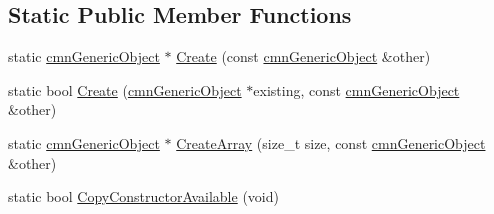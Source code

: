 \subsection*{Static Public Member Functions}
\begin{DoxyCompactItemize}
\item 
static \hyperlink{classcmn_generic_object}{cmn\-Generic\-Object} $\ast$ \hyperlink{classcmn_conditional_object_factory_copy_3_01true_00_01mts_generic_object_proxy_3_01__element_type_01_4_01_4_a7e210cb7361d95eb1a34c97960e260f6}{Create} (const \hyperlink{classcmn_generic_object}{cmn\-Generic\-Object} \&other)
\item 
static bool \hyperlink{classcmn_conditional_object_factory_copy_3_01true_00_01mts_generic_object_proxy_3_01__element_type_01_4_01_4_ac0df6ce8746ed47ad7cd37d5a4e576a3}{Create} (\hyperlink{classcmn_generic_object}{cmn\-Generic\-Object} $\ast$existing, const \hyperlink{classcmn_generic_object}{cmn\-Generic\-Object} \&other)
\item 
static \hyperlink{classcmn_generic_object}{cmn\-Generic\-Object} $\ast$ \hyperlink{classcmn_conditional_object_factory_copy_3_01true_00_01mts_generic_object_proxy_3_01__element_type_01_4_01_4_aad78eeb6ae10afc87109b2addc249a62}{Create\-Array} (size\-\_\-t size, const \hyperlink{classcmn_generic_object}{cmn\-Generic\-Object} \&other)
\item 
static bool \hyperlink{classcmn_conditional_object_factory_copy_3_01true_00_01mts_generic_object_proxy_3_01__element_type_01_4_01_4_a5afbf22adee42cc8dd0b6fd836b31fd5}{Copy\-Constructor\-Available} (void)
\end{DoxyCompactItemize}



